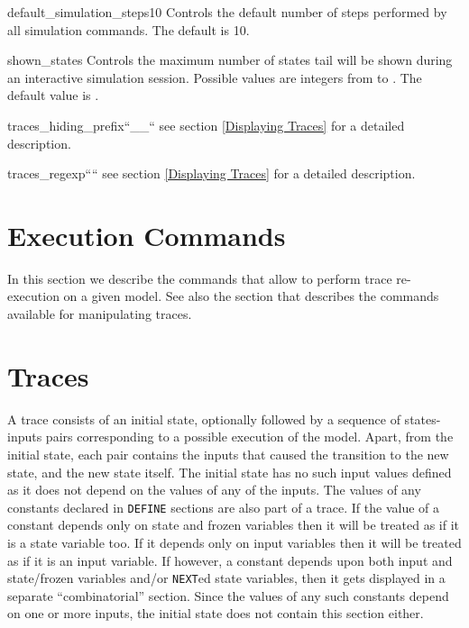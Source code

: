 



\begin{nusmvVar} {default\_simulation\_steps}{}{10}
Controls the default number of steps performed by all simulation
commands. The default is 10.
\end{nusmvVar}

\begin{nusmvVar} {shown\_states}{}{}
Controls the  maximum number  of states tail  will be shown  during an
interactive simulation session. Possible values are integers from
 to . The default value is .
\end{nusmvVar}

\begin{nusmvVar} {traces\_hiding\_prefix}{}{``\_\_``}
see section \ref{Displaying Traces} for a detailed description.
\end{nusmvVar}

\begin{nusmvVar} {traces\_regexp}{}{````}
see section \ref{Displaying Traces} for a detailed description.
\end{nusmvVar}

\section{Execution Commands}
\label{Execution Commands}

In this section we describe the commands that allow to perform
trace re-execution on a given model. See also the section  that
describes the commands available for manipulating traces.




\section{Traces}
\label{Traces}
% 
A trace consists of an initial state, optionally followed by a
sequence of states-inputs pairs corresponding to a possible execution
of the model. Apart, from the initial state, each pair contains the
inputs that caused the transition to the new state, and the new state
itself. The initial state has no such input values defined as it does
not depend on the values of any of the inputs. The values of any
constants declared in \texttt{DEFINE} sections are also part of a
trace. If the value of a constant depends only on state and frozen
variables then it will be treated as if it is a state variable too. If
it depends only on input variables then it will be treated as if it is
an input variable. If however, a constant depends upon both input and
state/frozen variables and/or \texttt{NEXT}ed state variables, then it
gets displayed in a separate ``combinatorial'' section. Since the
values of any such constants depend on one or more inputs, the initial
state does not contain this section either.\\

